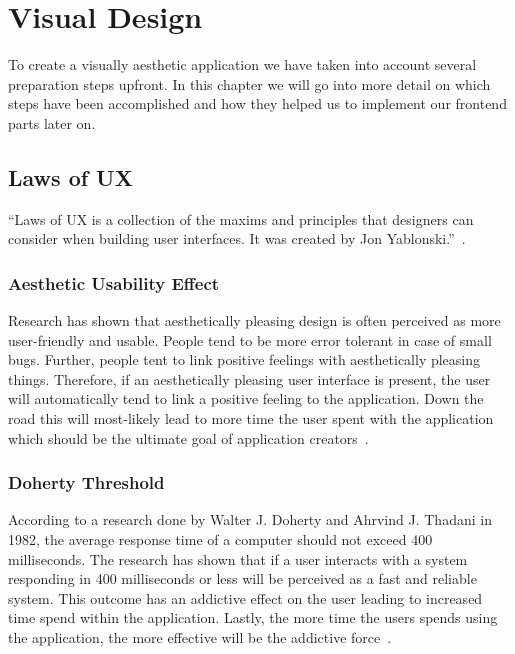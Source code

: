 

\chapter{Visual Design}\label{ch:visual-design}

To create a visually aesthetic application we have taken into account several preparation steps upfront. In this chapter
we will go into more detail on which steps have been accomplished and how they helped us to implement our frontend parts
later on.


\section{Laws of UX}\label{sec:laws-of-ux}

\enquote{Laws of UX is a collection of the maxims and principles that designers can consider when building user interfaces.
It was created by Jon Yablonski.}~\cite{lawsofux}.

\subsection{Aesthetic Usability Effect}\label{subsec:aestetic-usability-effect}

Research has shown that aesthetically pleasing design is often perceived as more user-friendly and usable.
People tend to be more error tolerant in case of small bugs.
Further, people tent to link positive feelings with aesthetically pleasing things.
Therefore, if an aesthetically pleasing user interface is present, the user will automatically tend to link a positive
feeling to the application.
Down the road this will most-likely lead to more time the user spent with the application which should be the ultimate
goal of application creators~\cite{lawsofuxAUE}.

\subsection{Doherty Threshold}\label{subsec:doherty-threshold}
According to a research done by Walter J. Doherty and Ahrvind J. Thadani in 1982, the average response time of a
computer should not exceed 400 milliseconds.
The research has shown that if a user interacts with a system responding in 400 milliseconds or less will be perceived
as a fast and reliable system.
This outcome has an addictive effect on the user leading to increased time spend within the application.
Lastly, the more time the users spends using the application, the more effective will be the addictive
force~\cite{lawsofuxDT}.

